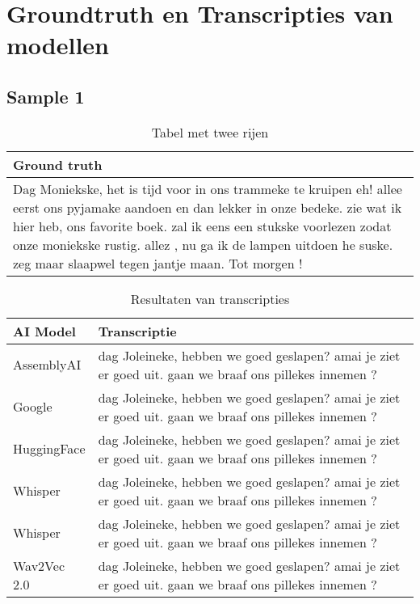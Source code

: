\section{Groundtruth en Transcripties van modellen}

\subsection{Sample 1}

\begin{table}[htbp]
    \centering
    \label{tab:groundtruth_sample1}
    \begin{tabularx}{\textwidth}{|X|}
        \hline
            \textbf{Ground truth} \\
          
        \hline
            Dag Moniekske, het is tijd voor in ons trammeke te kruipen eh! allee eerst ons pyjamake aandoen en dan lekker in onze bedeke. zie wat ik hier heb, ons favorite boek. zal ik eens een stukske voorlezen zodat onze moniekske rustig. allez , nu ga ik de lampen uitdoen he suske. zeg maar slaapwel tegen jantje maan. Tot morgen ! \\
        \hline
    \end{tabularx}
    \caption{Tabel met twee rijen}
\end{table}

\begin{table}[htbp]
    \centering
    \label{tab:results_sample1}
    \begin{tabularx}{\textwidth}{|l|X|}
        \hline
        \textbf{AI Model} & \textbf{Transcriptie} \\ \midrule

        AssemblyAI & dag Joleineke, hebben we goed geslapen? amai je ziet er goed uit. gaan we braaf ons pillekes innemen ? \\ \hline
        
        Google & dag Joleineke, hebben we goed geslapen? amai je ziet er goed uit. gaan we braaf ons pillekes innemen ? \\ \hline
        
        HuggingFace & dag Joleineke, hebben we goed geslapen? amai je ziet er goed uit. gaan we braaf ons pillekes innemen ? \\ \hline
        
        Whisper & dag Joleineke, hebben we goed geslapen? amai je ziet er goed uit. gaan we braaf ons pillekes innemen ? \\ \hline
        
        Whisper & dag Joleineke, hebben we goed geslapen? amai je ziet er goed uit. gaan we braaf ons pillekes innemen ? \\ \hline
        
        Wav2Vec 2.0 & dag Joleineke, hebben we goed geslapen? amai je ziet er goed uit. gaan we braaf ons pillekes innemen ? \\ \hline
    \end{tabularx}
    \caption{Resultaten van transcripties}
\end{table}
\FloatBarrier
